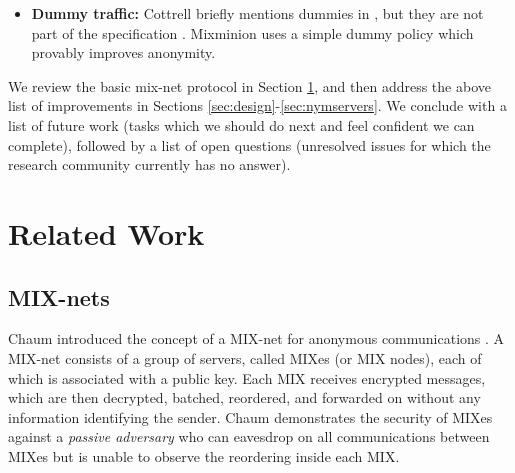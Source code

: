 \documentclass[11pt]{IEEEtran}
\begin{document}
\begin{itemize}
\item \textbf{Dummy traffic:} Cottrell briefly mentions dummies in
\cite{mixmaster-attacks}, but they are not part of the specification
\cite{mixmaster-spec}. Mixminion uses a simple dummy policy which provably
improves anonymity. %

\end{itemize}


We review the basic mix-net protocol in Section \ref{sec:related},
and then address the above list of improvements in Sections
\ref{sec:design}-\ref{sec:nymservers}. We conclude with a list of future
work (tasks which we should do next and feel confident we can complete),
followed by a list of open questions (unresolved issues for which the
research community currently has no answer).




\section{Related Work}
\label{sec:related}

\subsection{MIX-nets}

Chaum introduced the concept of a MIX-net for anonymous communications
\cite{chaum-mix}. A MIX-net consists of a group of servers, called
MIXes (or MIX nodes), each of which is associated with a public
key. Each MIX receives encrypted messages, which are then decrypted,
batched, reordered, and forwarded on without any information
identifying the sender. Chaum demonstrates the security of MIXes
against a \emph{passive adversary} who can eavesdrop on all
communications between MIXes but is unable to observe the reordering
inside each MIX.
\end{document}
